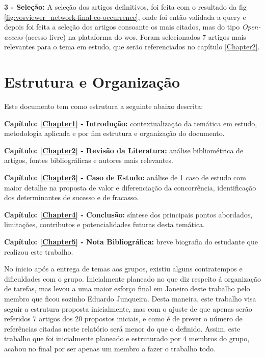 {\setlength{\parindent}{0pt}
\textbf{ 3 - Seleção:}
}
A seleção dos artigos definitivos, foi feita com o resultado da \gls{fig} \ref{fig:vosviewer_network-final-co-occurrence}, onde foi então validada a \gls{query} e depois foi feita a seleção dos artigos consoante os mais citados, mas do tipo \textit{Open-access} (acesso livre) na plataforma do \gls{wos}.
Foram selecionados 7 artigos mais relevantes para o tema em estudo, que serão referenciados no capítulo \ref{Chapter2}.

\section{Estrutura e Organização}
\label{sec:estrutura_organizacao}

Este documento tem como estrutura a seguinte abaixo descrita:

{\setlength{\parindent}{0pt}

\textbf{ Capítulo: \ref{Chapter1} - Introdução:} contextualização da temática em estudo, metodologia aplicada e por fim estrutura e organização do documento.

\textbf{ Capítulo: \ref{Chapter2} - Revisão da Literatura:} análise bibliométrica de artigos, fontes bibliográficas e autores mais relevantes.

\textbf{ Capítulo: \ref{Chapter3} - Caso de Estudo:} análise de 1 caso de estudo com maior detalhe na proposta de valor e diferenciação da concorrência, identificação dos determinantes de sucesso e de fracasso.

\textbf{ Capítulo: \ref{Chapter4} - Conclusão:} síntese dos principais pontos abordados, limitações, contributos e potencialidades futuras desta temática.


\textbf{ Capítulo: \ref{Chapter5} - Nota Bibliográfica:} breve biografia do estudante que realizou este trabalho.
}
No ínicio após a entrega de temas aos grupos, existiu alguns contratempos e dificuldades com o grupo. Inicialmente planeado no que diz respeito á organização de tarefas, mas levou a uma maior esforço final em Janeiro deste trabalho pelo membro que ficou sozinho Eduardo Junqueira.
Desta maneira, este trabalho  visa seguir a estrutura proposta inicialmente, mas com o ajuste de que apenas serão referidos 7 artigos dos 20 propostos iniciais, e como é de prever o número de referências citadas neste relatório será menor do que o definido.
Assim, este trabalho que foi inicialmente planeado e estruturado por 4 membros do grupo, acabou no final por ser apenas um membro a fazer o trabalho todo.
